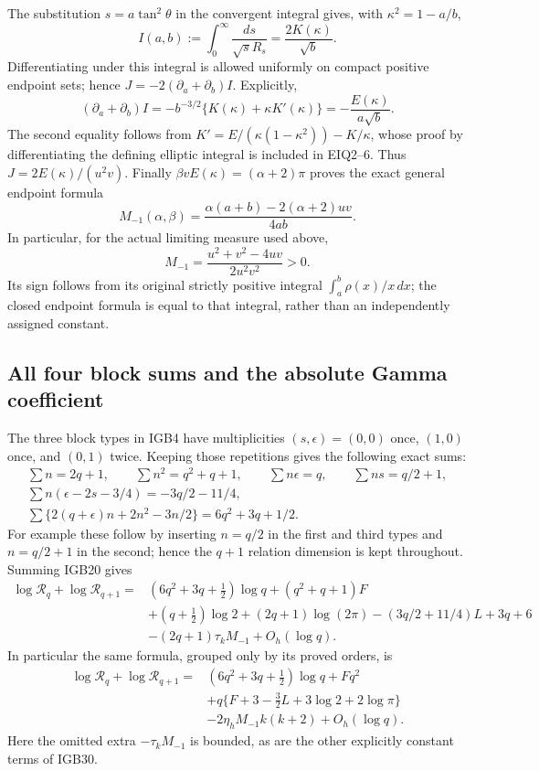 The substitution $s=a\tan^2\theta$ in the convergent integral
gives, with $\kappa^2=1-a/b$,
\[
 I(a,b):=\int_0^\infty\frac{ds}{\sqrt{s}R_s}
       =\frac{2K(\kappa)}{\sqrt b}.
 \tag{IGB25}
\]
Differentiating under this integral is allowed uniformly on
compact positive endpoint sets; hence
$J=-2(\partial_a+\partial_b)I$.
Explicitly,
\[
 (\partial_a+\partial_b)I
 =-b^{-3/2}\{K(\kappa)+\kappa K'(\kappa)\}
 =-\frac{E(\kappa)}{a\sqrt b}.
 \tag{IGB26}
\]
The second equality follows from
$K'=E/(\kappa(1-\kappa^2))-K/\kappa$, whose proof by
differentiating the defining elliptic integral is included
in EIQ2--6. Thus $J=2E(\kappa)/(u^2v)$.
Finally $\beta vE(\kappa)=(\alpha+2)\pi$ proves the exact
general endpoint formula
\[
 M_{-1}(\alpha,\beta)
 =\frac{\alpha(a+b)-2(\alpha+2)uv}{4ab}.
 \tag{IGB27}
\]
In particular, for the actual limiting measure used above,
\[
 \boxed{\displaystyle
 M_{-1}=\frac{u^2+v^2-4uv}{2u^2v^2}>0.}
 \tag{IGB28}
\]
Its sign follows from its original strictly positive integral
$\int_a^b\rho(x)/x\,dx$; the closed endpoint formula is equal
to that integral, rather than an independently assigned constant.

\subsection{All four block sums and the absolute Gamma coefficient}

The three block types in IGB4 have multiplicities
$(s,\epsilon)=(0,0)$ once, $(1,0)$ once, and $(0,1)$ twice.
Keeping those repetitions gives the following exact sums:
\[
 \begin{gathered}
 \sum n=2q+1,\qquad \sum n^2=q^2+q+1,\qquad
 \sum n\epsilon=q,\qquad \sum ns=q/2+1,\\
 \sum n(\epsilon-2s-3/4)=-3q/2-11/4,\\
 \sum\{2(q+\epsilon)n+2n^2-3n/2\}
                         =6q^2+3q+1/2.
 \end{gathered}\tag{IGB29}
\]
For example these follow by inserting $n=q/2$ in the first and
third types and $n=q/2+1$ in the second; hence the $q+1$
relation dimension is kept throughout. Summing IGB20 gives
\[
 \begin{aligned}
 \log\mathcal R_q+\log\mathcal R_{q+1}
 ={}&(6q^2+3q+\tfrac12)\log q+(q^2+q+1)F\\
 &+(q+\tfrac12)\log2+(2q+1)\log(2\pi)
 -(3q/2+11/4)L+3q+6\\
 &-(2q+1)\tau_kM_{-1}+O_h(\log q).
 \end{aligned}\tag{IGB30}
\]
In particular the same formula, grouped only by its proved orders, is
\[
 \begin{aligned}
 \log\mathcal R_q+\log\mathcal R_{q+1}
 ={}&(6q^2+3q+\tfrac12)\log q+Fq^2\\
 &+q\{F+3-\tfrac32L+3\log2+2\log\pi\}\\
 &-2\eta_hM_{-1}k(k+2)+O_h(\log q).
 \end{aligned}\tag{IGB31}
\]
Here the omitted extra $-\tau_kM_{-1}$ is bounded, as are the
other explicitly constant terms of IGB30.

